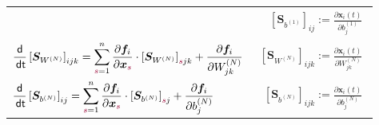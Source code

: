 \documentclass[a4paper, 12pt]{scrartcl}
\newcommand{\dunkelrot}[2][dunkelrot]{\textcolor{#1}{#2}}
\newcommand{\dt}{\thinspace \mathsf{dt}}
\begin{document}
\begin{center}
\begin{tabular}{l r}
    &
    $\begin{aligned}
        \left[
            \bm{S}_{b^{(1)}}
        \right]_{ij} 
        := 
        \frac{\partial \bm{x}_i(t)}{\partial b^{(1)}_{j}}
    \end{aligned}$
    \\
    $\begin{aligned}
        \frac{\mathsf{d}}{\dt} \left[\bm{S}_{W^{(N)}}\right]_{ijk}
        =
        \sum_{\dunkelrot{s}=1}^{n}
        \frac{\partial \bm{f}_i}{\partial \bm{x}_{\dunkelrot{s}}}
        \cdot 
        \left[\bm{S}_{W^{(N)}}\right]_{\dunkelrot{s}jk}
        +
        \frac{\partial \bm{f}_i}{\partial W^{(N)}_{jk}}
    \end{aligned}$
    &
    $\begin{aligned}
        \left[
            \bm{S}_{W^{(N)}}
        \right]_{ijk} 
        := 
        \frac{\partial \bm{x}_i(t)}{\partial W^{(N)}_{jk}}
    \end{aligned}$
    \\
    $\begin{aligned}
        \frac{\mathsf{d}}{\dt} \left[\bm{S}_{b^{(N)}}\right]_{ij}
        =
        \sum_{\dunkelrot{s}=1}^{n}
        \frac{\partial \bm{f}_i}{\partial \bm{x}_{\dunkelrot{s}}}
        \cdot 
        \left[\bm{S}_{b^{(N)}}\right]_{\dunkelrot{s}j}
        +
        \frac{\partial \bm{f}_i}{\partial b^{(N)}_{j}}
    \end{aligned}$
    &
    $\begin{aligned}
        \left[
            \bm{S}_{b^{(N)}}
        \right]_{ijk} 
        := 
        \frac{\partial \bm{x}_i(t)}{\partial b^{(N)}_{j}}
    \end{aligned}$
\end{tabular}
\end{center}
\end{document}
